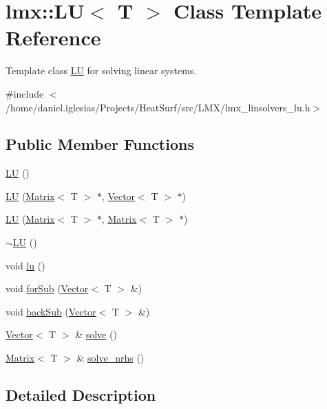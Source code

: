 \hypertarget{classlmx_1_1LU}{\section{lmx\-:\-:L\-U$<$ T $>$ Class Template Reference}
\label{classlmx_1_1LU}
}


Template class \hyperlink{classlmx_1_1LU}{L\-U} for solving linear systems.  




{\ttfamily \#include $<$/home/daniel.\-iglesias/\-Projects/\-Heat\-Surf/src/\-L\-M\-X/lmx\-\_\-linsolvers\-\_\-lu.\-h$>$}

\subsection*{Public Member Functions}
\begin{DoxyCompactItemize}
\item 
\hyperlink{classlmx_1_1LU_ae0748f405521cc5c91b77d6fdc0efa37}{L\-U} ()
\item 
\hyperlink{classlmx_1_1LU_a333753df17b4e937ca69a9f3fe4c0218}{L\-U} (\hyperlink{classlmx_1_1Matrix}{Matrix}$<$ T $>$ $\ast$, \hyperlink{classlmx_1_1Vector}{Vector}$<$ T $>$ $\ast$)
\item 
\hyperlink{classlmx_1_1LU_a276c80d745dbab33dbd58965e0e91ee4}{L\-U} (\hyperlink{classlmx_1_1Matrix}{Matrix}$<$ T $>$ $\ast$, \hyperlink{classlmx_1_1Matrix}{Matrix}$<$ T $>$ $\ast$)
\item 
\hyperlink{classlmx_1_1LU_a0e4a4990ea958e0a4724937152beaaca}{$\sim$\-L\-U} ()
\item 
void \hyperlink{classlmx_1_1LU_a7ebe0035cf0d15ebe2ca3812185eb714}{lu} ()
\item 
void \hyperlink{classlmx_1_1LU_a1002b88381fcc078127bc024174de975}{for\-Sub} (\hyperlink{classlmx_1_1Vector}{Vector}$<$ T $>$ \&)
\item 
void \hyperlink{classlmx_1_1LU_a9e0afee1109941d1dfcde166adc9bf39}{back\-Sub} (\hyperlink{classlmx_1_1Vector}{Vector}$<$ T $>$ \&)
\item 
\hyperlink{classlmx_1_1Vector}{Vector}$<$ T $>$ \& \hyperlink{classlmx_1_1LU_a59206cb45dccf004b9148804ba768c7a}{solve} ()
\item 
\hyperlink{classlmx_1_1Matrix}{Matrix}$<$ T $>$ \& \hyperlink{classlmx_1_1LU_a5ec8d836c648140710d0c4fcdd3763c8}{solve\-\_\-nrhs} ()
\end{DoxyCompactItemize}


\subsection{Detailed Description}
